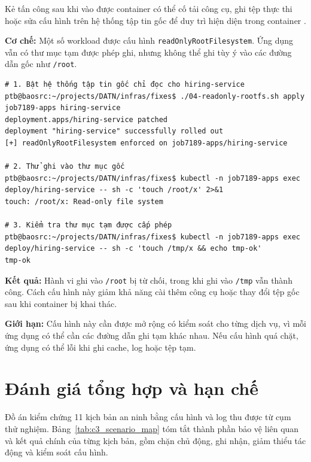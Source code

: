 Kẻ tấn công sau khi vào được container có thể cố tải công cụ, ghi tệp thực thi hoặc sửa cấu hình trên hệ thống tập tin gốc để duy trì hiện diện trong container \parencite{mitre_t1222}.

\textbf{Cơ chế:} Một số workload được cấu hình \texttt{readOnlyRootFilesystem}. Ứng dụng vẫn có thư mục tạm được phép ghi, nhưng không thể ghi tùy ý vào các đường dẫn gốc như \texttt{/root}.

\begin{listing}[H]
\begin{verbatim}
# 1. Bật hệ thống tập tin gốc chỉ đọc cho hiring-service
ptb@baosrc:~/projects/DATN/infras/fixes$ ./04-readonly-rootfs.sh apply job7189-apps hiring-service
deployment.apps/hiring-service patched
deployment "hiring-service" successfully rolled out
[+] readOnlyRootFilesystem enforced on job7189-apps/hiring-service

# 2. Thử ghi vào thư mục gốc
ptb@baosrc:~/projects/DATN/infras/fixes$ kubectl -n job7189-apps exec deploy/hiring-service -- sh -c 'touch /root/x' 2>&1
touch: /root/x: Read-only file system

# 3. Kiểm tra thư mục tạm được cấp phép
ptb@baosrc:~/projects/DATN/infras/fixes$ kubectl -n job7189-apps exec deploy/hiring-service -- sh -c 'touch /tmp/x && echo tmp-ok'
tmp-ok
\end{verbatim}
\caption{Kiểm thử hệ thống tập tin gốc chỉ đọc}
\label{lst:c3_kb11}
\end{listing}

\textbf{Kết quả:} Hành vi ghi vào \texttt{/root} bị từ chối, trong khi ghi vào \texttt{/tmp} vẫn thành công. Cách cấu hình này giảm khả năng cài thêm công cụ hoặc thay đổi tệp gốc sau khi container bị khai thác.

\textbf{Giới hạn:} Cấu hình này cần được mở rộng có kiểm soát cho từng dịch vụ, vì mỗi ứng dụng có thể cần các đường dẫn ghi tạm khác nhau. Nếu cấu hình quá chặt, ứng dụng có thể lỗi khi ghi cache, log hoặc tệp tạm.

\section{Đánh giá tổng hợp và hạn chế}

Đồ án kiểm chứng 11 kịch bản an ninh bằng cấu hình và log thu được từ cụm thử nghiệm. Bảng~\ref{tab:c3_scenario_map} tóm tắt thành phần bảo vệ liên quan và kết quả chính của từng kịch bản, gồm chặn chủ động, ghi nhận, giảm thiểu tác động và kiểm soát cấu hình.

